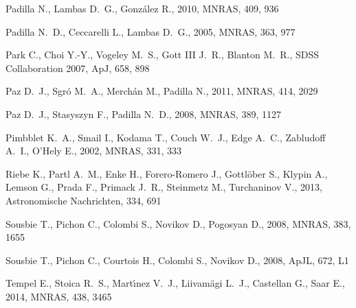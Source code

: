 \documentclass[useAMS,usenatbib]{mn2e}
\newcommand{\apj}{ApJ}
\newcommand{\apjl}{ApJL}
\newcommand{\mnras}{MNRAS}
\begin{document}
\begin{thebibliography}{}
{Padilla} N.,  {Lambas} D.~G.,    {Gonz{\'a}lez} R.,  2010, \mnras, 409, 936

{Padilla} N.~D.,  {Ceccarelli} L.,    {Lambas} D.~G.,  2005, \mnras, 363, 977

{Park} C.,  {Choi} Y.-Y.,  {Vogeley} M.~S.,  {Gott} III J.~R.,  {Blanton}
  M.~R.,    {SDSS Collaboration} 2007, \apj, 658, 898

{Paz} D.~J.,  {Sgr{\'o}} M.~A.,  {Merch{\'a}n} M.,    {Padilla} N.,  2011,
  \mnras, 414, 2029

{Paz} D.~J.,  {Stasyszyn} F.,    {Padilla} N.~D.,  2008, \mnras, 389, 1127

{Pimbblet} K.~A.,  {Smail} I.,  {Kodama} T.,  {Couch} W.~J.,  {Edge} A.~C.,
  {Zabludoff} A.~I.,    {O'Hely} E.,  2002, \mnras, 331, 333

{Riebe} K.,  {Partl} A.~M.,  {Enke} H.,  {Forero-Romero} J.,  {Gottl{\"o}ber}
  S.,  {Klypin} A.,  {Lemson} G.,  {Prada} F.,  {Primack} J.~R.,  {Steinmetz}
  M.,    {Turchaninov} V.,  2013, Astronomische Nachrichten, 334, 691

{Sousbie} T.,  {Pichon} C.,  {Colombi} S.,  {Novikov} D.,    {Pogosyan} D.,
  2008, \mnras, 383, 1655

{Sousbie} T.,  {Pichon} C.,  {Courtois} H.,  {Colombi} S.,    {Novikov} D.,
  2008, \apjl, 672, L1

{Tempel} E.,  {Stoica} R.~S.,  {Mart{\'{\i}}nez} V.~J.,  {Liivam{\"a}gi} L.~J.,
   {Castellan} G.,    {Saar} E.,  2014, \mnras, 438, 3465


\end{thebibliography}
\end{document}
